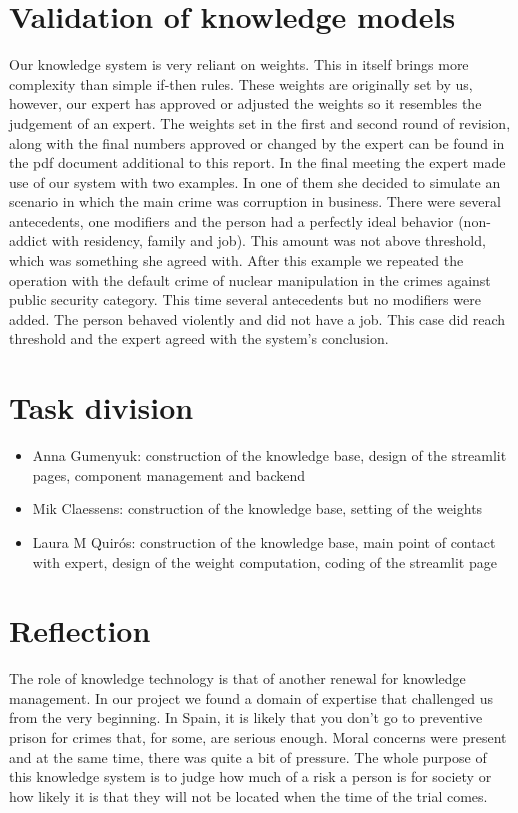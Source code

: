 \documentclass{article}
\begin{document}
\section{Validation of knowledge models} %
Our knowledge system is very reliant on weights. This in itself brings more complexity than simple if-then rules. These weights are originally set by us, however, our expert has approved or adjusted the weights so it resembles the judgement of an expert. 
The weights set in the first and second round of revision, along with the final numbers approved or changed by the expert can be found in the pdf document additional to this report. 
In the final meeting the expert made use of our system with two examples. In one of them she decided to simulate an scenario in which the main crime was corruption in business. There were several antecedents, one modifiers and the person had a perfectly ideal behavior (non-addict with residency, family and job). This amount was not above threshold, which was something she agreed with.
After this example we repeated the operation with the default crime of nuclear manipulation in the crimes against public security category. This time several antecedents but no modifiers were added. The person behaved violently and did not have a job. This case did reach threshold and the expert agreed with the system's conclusion.

\section{Task division} %
\begin{itemize}
    \item Anna Gumenyuk: construction of the knowledge base, design of the streamlit pages, component management and backend
    \item Mik Claessens: construction of the knowledge base, setting of the weights
    \item Laura M Quirós: construction of the knowledge base, main point of contact with expert, design of the weight computation, coding of the streamlit page
\end{itemize}
\section{Reflection} %
The role of knowledge technology is that of another renewal for knowledge management. In our project we found a domain of expertise that challenged us from the very beginning. In Spain, it is likely that you don't go to preventive prison for crimes that, for some, are serious enough. Moral concerns were present and at the same time, there was quite a bit of pressure. The whole purpose of this knowledge system is to judge how much of a risk a person is for society or how likely it is that they will not be located when the time of the trial comes. 
\end{document}
